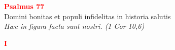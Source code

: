 


\def\greinitialformat#1{%
{\fontsize{39}{39}\selectfont #1}%
}




\vspace{0.3cm}
\begin{center}
 \textcolor{red}{\large \bf Psalmus 77}\\
Domini bonitas et populi infidelitas in historia salutis\\
\textit{\small Hæc in figura facta sunt nostri. (1 Cor 10,6)}
\end{center}
\begin{center}
\textcolor{red}{\large \bf I}\\
\end{center}
